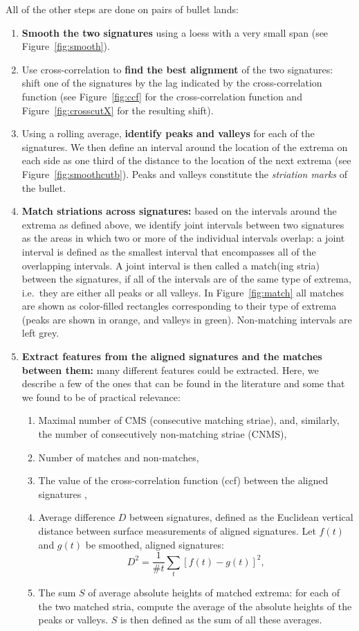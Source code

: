 \documentclass[aoas, preprint]{imsart}\usepackage[]{graphicx}\usepackage[]{color}
\begin{document}
All of the other steps are done on pairs of bullet lands:
\begin{enumerate}
\item {\bf Smooth the two signatures} using a loess with a very small span (see Figure~\ref{fig:smooth}). 
\item Use cross-correlation to {\bf find the best alignment} of the two signatures: shift one of the signatures by the lag indicated by the cross-correlation function (see Figure~\ref{fig:ccf} for the cross-correlation function and Figure~\ref{fig:crosscutX} for the resulting shift).
\item Using a rolling average, {\bf identify peaks and valleys} for each of the signatures. We then define an interval around the location of the extrema on each side as one third of the distance to the location of the next extrema (see Figure~\ref{fig:smoothcutb}). Peaks and valleys constitute the \emph{striation marks} of the bullet.
\item {\bf Match striations across signatures:} based on the intervals around the extrema as defined above, we identify joint intervals between two signatures as the areas in which two or more of the individual intervals overlap: a joint interval is defined as the smallest interval that encompasses all of the overlapping intervals. A joint interval is then called a match(ing stria) between the signatures, if all of the intervals are of the same type of extrema, i.e.\ they are either all peaks or all valleys. In Figure~\ref{fig:match} all matches are shown as color-filled rectangles corresponding to their type of extrema (peaks are shown in orange, and valleys in green). Non-matching intervals are left grey. 
\item {\bf Extract features from the aligned signatures and the matches between them:} many different features could be extracted. Here, we describe a few of the ones that can be found in the literature and some that we found to be of practical relevance:
\begin{enumerate}[label=(\roman*)]
\item Maximal number of CMS (consecutive matching striae), and, similarly, the number of consecutively non-matching striae (CNMS), 
\item Number of matches and non-matches,
\item The value of the cross-correlation function (ccf) between the aligned signatures \cite{vorburger:2011},
\item Average difference $D$ between signatures, defined as the Euclidean vertical distance between surface measurements of aligned signatures. Let $f(t)$ and $g(t)$ be smoothed, aligned signatures:
\[
D^2 = \frac{1}{\text{\#}t}\sum_t \left[f(t) - g(t)\right]^2,
\]
\item The sum $S$ of average absolute heights of matched extrema: for each of the two matched stria, compute the average of the absolute heights of the peaks or valleys. $S$ is then defined as the sum of all these averages. 
\end{enumerate}
\end{enumerate}
\end{document}
